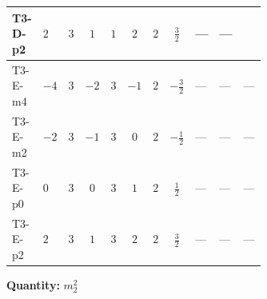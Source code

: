 \documentclass[8pt]{article}
\begin{document}
\begin{landscape}
\begin{longtable}{@{}llcccccc >{\raggedright\arraybackslash}p{0.21\linewidth} >{\raggedright\arraybackslash}p{0.21\linewidth} >{\raggedright\arraybackslash}p{0.21\linewidth}@{}}
\midrule
T3-D-p2 & $2$ & $3$ & $1$ & $1$ & $2$ & $2$ & $\frac{3}{2}$ & --- & --- & \scriptsize\adjustbox{max width=\linewidth}{$\begin{gathered} {m_2^2} (4 T_{\nu}^{(2)}+4 {\lambda_{S_2}^{(1)}})\end{gathered}$} \\
\midrule
T3-E-m4 & $-4$ & $3$ & $-2$ & $3$ & $-1$ & $2$ & $-\frac{3}{2}$ & --- & --- & --- \\
\midrule
T3-E-m2 & $-2$ & $3$ & $-1$ & $3$ & $0$ & $2$ & $-\frac{1}{2}$ & --- & --- & --- \\
\midrule
T3-E-p0 & $0$ & $3$ & $0$ & $3$ & $1$ & $2$ & $\frac{1}{2}$ & --- & --- & --- \\
\midrule
T3-E-p2 & $2$ & $3$ & $1$ & $3$ & $2$ & $2$ & $\frac{3}{2}$ & --- & --- & --- \\
\midrule
\bottomrule
\end{longtable}
\clearpage
\noindent\textbf{Quantity: }$m_2^2$\par\smallskip

\end{landscape}
\end{document}
